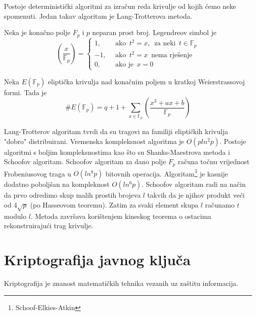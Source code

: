 \documentclass{mathos}
\begin{document}
Postoje deterministički algoritmi za izračun reda krivulje od kojih ćemo neke spomenuti. Jedan takav algoritam je Lang-Trotterova metoda.

\begin{defin}
    Neka je konačno polje $F_p$ i $p$ neparan prost broj. Legendreov simbol je
    \[ \left(\frac{x}{\mathbb{F}_p}\right) = \begin{cases}
        1, & \enspace\text{ako}\enspace t^2 = x, \enspace \text{za neki} \enspace t \in \mathbb{F}_p \\
        -1, & \enspace\text{ako}\enspace t^2 = x \enspace \text{nema rješenje} \\
        0, & \enspace\text{ako je}\enspace x = 0
    \end{cases} \]
\end{defin}

\begin{theorem}
    Neka $E(\mathbb{F}_p)$ eliptička krivulja nad konačnim poljem u kratkoj Weierstrassovoj formi. Tada je
    \[ \#E(\mathbb{F}_p) = q + 1 + \sum_{x\in\mathbb{F}_p}^{} \left(\frac{x^3 + ax + b}{\mathbb{F}_p}\right) \]
\end{theorem}

Lang-Trotterov algoritam tvrdi da su tragovi na familiji eliptičkih krivulja "dobro" distribuirani. Vremenska kompleksnost algoritma je $O(pln^2p)$. Postoje algoritmi s boljim kompleksnostima kao što su Shanks-Maestrova metoda i Schoofov algoritam. Schoofov algoritam za dano polje $F_p$ računa točnu vrijednost Frobeniusovog traga u $O(ln^8p)$ bitovnih operacija. Algoritam\footnote{Schoof-Elkies-Atkin} je kasnije dodatno poboljšan na kompleknost $O(ln^6p)$. Schoofov algoritam radi na način da prvo odredimo skup malih prostih brojeva $l$ takvih da je njihov produkt veći od $4\sqrt{p}$ (po Hasseovom teoremu). Zatim za svaki element skupa $l$ računamo $t$ modulo $l$. Metoda završava korištenjem kineskog teorema o ostacima rekonstruirajući trag krivulje.

\chapter{Kriptografija javnog ključa}

\begin{defin}
    Kriptografija je znanost matematičkih tehnika vezanih uz zaštitu informacija.
\end{defin}
\end{document}
